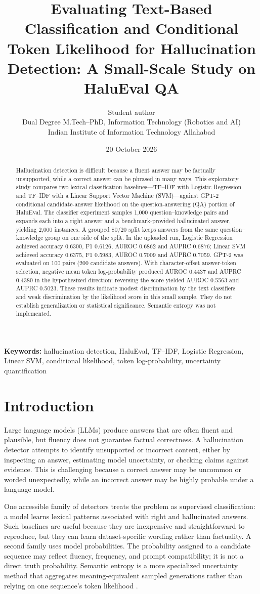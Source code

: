 \documentclass[11pt]{article}
\title{Evaluating Text-Based Classification and Conditional Token Likelihood for Hallucination Detection: A Small-Scale Study on HaluEval QA}
\author{Student author\\Dual Degree M.Tech--PhD, Information Technology (Robotics and AI)\\Indian Institute of Information Technology Allahabad}
\date{20 October 2026}
\begin{document}
\maketitle
\begin{abstract}
Hallucination detection is difficult because a fluent answer may be factually unsupported, while a correct answer can be phrased in many ways. This exploratory study compares two lexical classification baselines---TF--IDF with Logistic Regression and TF--IDF with a Linear Support Vector Machine (SVM)---against GPT-2 conditional candidate-answer likelihood on the question-answering (QA) portion of HaluEval. The classifier experiment samples 1,000 question--knowledge pairs and expands each into a right answer and a benchmark-provided hallucinated answer, yielding 2,000 instances. A grouped 80/20 split keeps answers from the same question--knowledge group on one side of the split. In the uploaded run, Logistic Regression achieved accuracy 0.6300, F1 0.6126, AUROC 0.6862 and AUPRC 0.6876; Linear SVM achieved accuracy 0.6375, F1 0.5983, AUROC 0.7009 and AUPRC 0.7059. GPT-2 was evaluated on 100 pairs (200 candidate answers). With character-offset answer-token selection, negative mean token log-probability produced AUROC 0.4437 and AUPRC 0.4380 in the hypothesized direction; reversing the score yielded AUROC 0.5563 and AUPRC 0.5023. These results indicate modest discrimination by the text classifiers and weak discrimination by the likelihood score in this small sample. They do not establish generalization or statistical significance. Semantic entropy was not implemented.
\end{abstract}
\noindent\textbf{Keywords:} hallucination detection, HaluEval, TF--IDF, Logistic Regression, Linear SVM, conditional likelihood, token log-probability, uncertainty quantification

\section{Introduction}
Large language models (LLMs) produce answers that are often fluent and plausible, but fluency does not guarantee factual correctness. A hallucination detector attempts to identify unsupported or incorrect content, either by inspecting an answer, estimating model uncertainty, or checking claims against evidence. This is challenging because a correct answer may be uncommon or worded unexpectedly, while an incorrect answer may be highly probable under a language model.

One accessible family of detectors treats the problem as supervised classification: a model learns lexical patterns associated with right and hallucinated answers. Such baselines are useful because they are inexpensive and straightforward to reproduce, but they can learn dataset-specific wording rather than factuality. A second family uses model probabilities. The probability assigned to a candidate sequence may reflect fluency, frequency, and prompt compatibility; it is not a direct truth probability. Semantic entropy is a more specialized uncertainty method that aggregates meaning-equivalent sampled generations rather than relying on one sequence's token likelihood \cite{farquhar2024semantic}.
\end{document}

